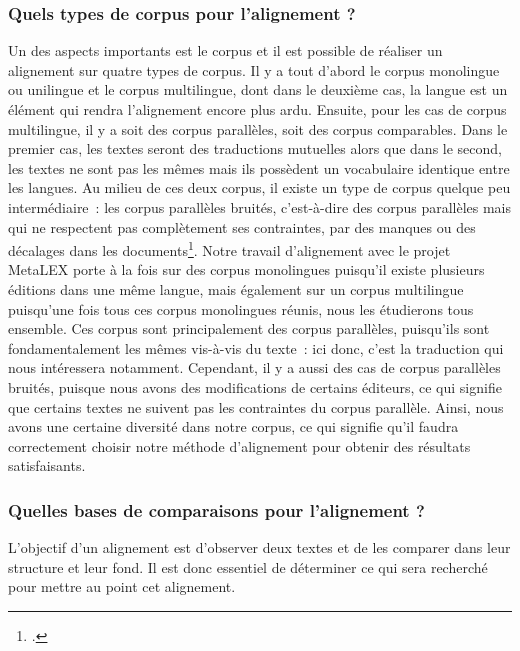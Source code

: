 \subsubsection{Quels types de corpus pour l'alignement ?}
Un des aspects importants est le corpus et il est possible de réaliser un alignement sur quatre types de corpus. Il y a tout d'abord le corpus monolingue ou unilingue et le corpus multilingue, dont dans le deuxième cas, la langue est un élément qui rendra l'alignement encore plus ardu. 
Ensuite, pour les cas de corpus multilingue, il y a soit des corpus parallèles, soit des corpus comparables. Dans le premier cas, les textes seront des traductions mutuelles alors que dans le second, les textes ne sont pas les mêmes mais ils possèdent un vocabulaire identique entre les langues. Au milieu de ces deux corpus, il existe un type de corpus quelque peu intermédiaire~: les corpus parallèles bruités, c'est-à-dire des corpus parallèles mais qui ne respectent pas complètement ses contraintes, par des manques ou des décalages dans les documents\footcite[p.~4-6]{alignement_prochasson}. Notre travail d'alignement avec le projet MetaLEX porte à la fois sur des corpus monolingues puisqu'il existe plusieurs éditions dans une même langue, mais également sur un corpus multilingue puisqu'une fois tous ces corpus monolingues réunis, nous les étudierons tous ensemble. Ces corpus sont principalement des corpus parallèles, puisqu'ils sont fondamentalement les mêmes vis-à-vis du texte~: ici donc, c'est la traduction qui nous intéressera notamment. Cependant, il y a aussi des cas de corpus parallèles bruités, puisque nous avons des modifications de certains éditeurs, ce qui signifie que certains textes ne suivent pas les contraintes du corpus parallèle. Ainsi, nous avons une certaine diversité dans notre corpus, ce qui signifie qu'il faudra correctement choisir notre méthode d'alignement pour obtenir des résultats satisfaisants. 

\subsubsection{Quelles bases de comparaisons pour l'alignement ?}
L'objectif d'un alignement est d'observer deux textes et de les comparer dans leur structure et leur fond. Il est donc essentiel de déterminer ce qui sera recherché pour mettre au point cet alignement. 

